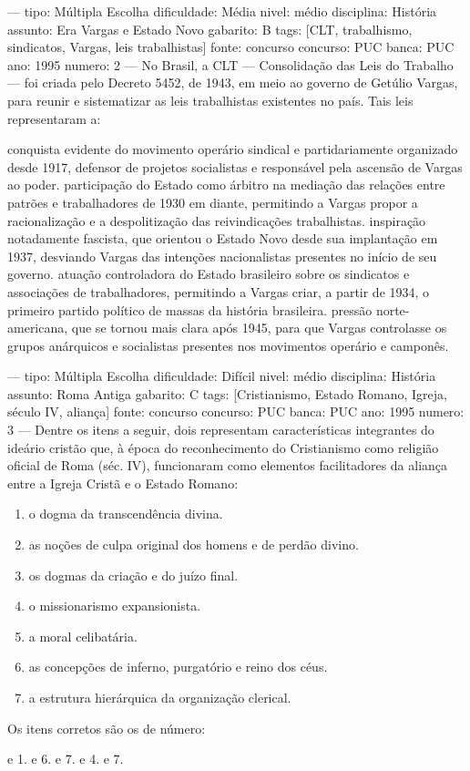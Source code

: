 ---
tipo: Múltipla Escolha
dificuldade: Média
nivel: médio
disciplina: História
assunto: Era Vargas e Estado Novo
gabarito: B
tags: [CLT, trabalhismo, sindicatos, Vargas, leis trabalhistas]
fonte: concurso
concurso: PUC
banca: PUC
ano: 1995
numero: 2
---
\question
No Brasil, a CLT --- Consolidação das Leis do Trabalho --- foi criada pelo Decreto 5452, de 1943, em meio ao governo de Getúlio Vargas, para reunir e sistematizar as leis trabalhistas existentes no país. Tais leis representaram a:
\begin{choices}
\choice conquista evidente do movimento operário sindical e partidariamente organizado desde 1917, defensor de projetos socialistas e responsável pela ascensão de Vargas ao poder.
\CorrectChoice participação do Estado como árbitro na mediação das relações entre patrões e trabalhadores de 1930 em diante, permitindo a Vargas propor a racionalização e a despolitização das reivindicações trabalhistas.
\choice inspiração notadamente fascista, que orientou o Estado Novo desde sua implantação em 1937, desviando Vargas das intenções nacionalistas presentes no início de seu governo.
\choice atuação controladora do Estado brasileiro sobre os sindicatos e associações de trabalhadores, permitindo a Vargas criar, a partir de 1934, o primeiro partido político de massas da história brasileira.
\choice pressão norte-americana, que se tornou mais clara após 1945, para que Vargas controlasse os grupos anárquicos e socialistas presentes nos movimentos operário e camponês.
\end{choices}

---
tipo: Múltipla Escolha
dificuldade: Difícil
nivel: médio
disciplina: História
assunto: Roma Antiga
gabarito: C
tags: [Cristianismo, Estado Romano, Igreja, século IV, aliança]
fonte: concurso
concurso: PUC
banca: PUC
ano: 1995
numero: 3
---
\question
Dentre os itens a seguir, dois representam características integrantes do ideário cristão que, à época do reconhecimento do Cristianismo como religião oficial de Roma (séc. IV), funcionaram como elementos facilitadores da aliança entre a Igreja Cristã e o Estado Romano:
\begin{enumerate}
\item o dogma da transcendência divina.
\item as noções de culpa original dos homens e de perdão divino.
\item os dogmas da criação e do juízo final.
\item o missionarismo expansionista.
\item a moral celibatária.
\item as concepções de inferno, purgatório e reino dos céus.
\item a estrutura hierárquica da organização clerical.
\end{enumerate}
Os itens corretos são os de número:
\begin{choices}
 e 1.
 e 6.
 e 7.
 e 4.
 e 7.
\end{choices}

